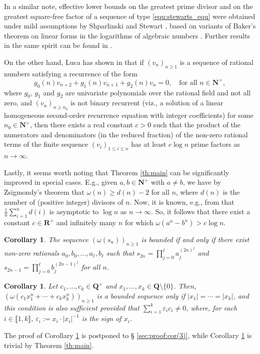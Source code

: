 \documentclass[reqno]{amsart}
\newtheorem{corollary}[theorem]{Corollary}%
\theoremstyle{remark}
\providecommand{\NNb}{\mathbf{N}}
\providecommand{\QQb}{\mathbf{Q}}
\providecommand{\RRb}{\mathbf{R}}
\providecommand\llb{\llbracket}
\providecommand\rrb{\rrbracket}
\begin{document}
In a similar note, effective lower bounds on the greatest prime divisor and on the greatest square-free factor of a sequence of type \eqref{equ:stewarts_equ} were obtained under mild assumptions by Shparlinski \cite{Shparli80} and Stewart \cite{Stewart1, Stewart3, Stewart2}, based on variants of Baker's theorem on linear forms in the logarithms of algebraic numbers \cite{BaWu}. Further results in the same spirit can be found in \cite[\S{ }6.2]{EPSW03}.

On the other hand, Luca has shown in \cite{Lu} that if $(v_n)_{n \ge 1}$ is a sequence of rational numbers satisfying a recurrence of the form
$$
g_0(n) v_{n+2} + g_1(n) v_{n+1} + g_2(n) v_n = 0, \quad\text{for all }n \in \NNb^+,
$$
where $g_0$, $g_1$ and $g_2$ are univariate polynomials over the rational field and not all zero, and $(v_n)_{n \ge n_0}$ is not binary recurrent (viz., a solution of a linear homogeneous second-order recurrence equation with integer coefficients) for some $n_0 \in \NNb^+$, then there exists a real constant $c > 0$ such that the product of the numerators and denominators (in the reduced fraction) of the non-zero rational terms of the finite sequence $(v_i)_{1 \le i \le n}$ has at least $c \log n$ prime factors as $n \to \infty$.

Lastly, it seems worth noting that Theorem \ref{th:main} can be significantly improved in special cases. E.g., given $a, b \in \mathbf N^+$ with $a \ne b$, we have by Zsigmondy's theorem \cite{Zsig} that $\omega(n) \ge d(n)-2$ for all $n$, where $d(n)$ is the number of (positive integer) divisors of $n$. Now, it is known, e.g., from \cite{SmSu} that $\frac{1}{n} \sum_{i=1}^n d(i)$ is asymptotic to $\log n$ as $n \to \infty$. So, it follows that there exist a constant $c \in \RRb^+$ and infinitely many $n$ for which $\omega(a^n-b^n)>c\log n$.
%
\begin{corollary}
\label{cor:(2)}
The sequence $(\omega(s_n))_{n \ge 1}$ is bounded if and only if there exist non-zero rationals $a_0,b_0,\ldots,a_\ell,b_\ell$ such that $s_{2n}=\prod_{j=0}^\ell a_j^{(2n)^j}$ and $s_{2n-1}=\prod_{j=0}^\ell b_j^{(2n-1)^j}$ for all $n$.
\end{corollary}
%
\begin{corollary}\label{corollary}
Let $c_1, \ldots, c_k \in \QQb^+$ and $x_1,\ldots,x_k \in \QQb \setminus \{0\}$. Then, $(\omega(c_1 x_1^n+\cdots+c_kx_k^n))_{n\ge 1}$ is a bounded sequence only if $|x_1|=\cdots=|x_k|$, and this condition is also sufficient provided that $\sum_{i=1}^k \varepsilon_i c_i \ne 0$, where, for each $i \in \llb 1, k \rrb$, $\varepsilon_i := x_i \cdot |x_i|^{-1}$ is the sign of $x_i$.
\end{corollary}
%
The proof of Corollary \ref{corollary} is postponed to \S{ }\ref{sec:proof:cor(3)}, while Corollary \ref{cor:(2)} is trivial by Theorem \ref{th:main}.
%
\end{document}
